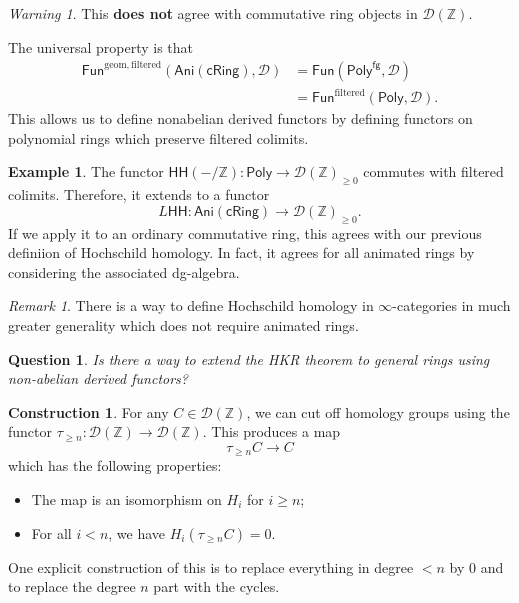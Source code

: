 \documentclass[10pt, oneside]{memoir}
\newtheorem{quest}[thm]{Question}
\theoremstyle{definition}
\newtheorem{con}[thm]{Construction}
\newtheorem{exm}[thm]{Example}
\theoremstyle{remark}
\newtheorem{rmk}[thm]{Remark}
\newtheorem{warn}[thm]{Warning}
\theoremstyle{plain}
\theoremstyle{definition}
\theoremstyle{remark}
\newcommand{\Z}{\mathbb{Z}}
\newcommand{\mc}[1]{\mathcal{#1}}
\newcommand{\mr}[1]{\mathrm{#1}}
\newcommand{\ms}[1]{\mathsf{#1}}
\newcommand{\1}{\mathbf{1}}
\newcommand{\2}{\mathbf{2}}
\newcommand{\3}{\mathbf{3}}
\newcommand{\HH}{\ms{HH}}
\begin{document}
\begin{warn}
    This \textbf{does not} agree with commutative ring objects in $\mc{D}(\Z)$.
\end{warn}

The universal property is that
\begin{align*}
    \ms{Fun}^{\mr{geom,filtered}}(\ms{Ani}(\ms{cRing}), \mc{D}) &= \ms{Fun}(\ms{Poly}^{\ms{fg}}, \mc{D}) \\
    &= \ms{Fun}^{\mr{filtered}}(\ms{Poly}, \mc{D}).
\end{align*}
This allows us to define nonabelian derived functors by defining functors on polynomial rings which preserve filtered colimits.

\begin{exm}
    The functor $\HH(-/\Z) \colon \ms{Poly} \to \mc{D}(\Z)_{\geq 0}$ commutes with filtered colimits. Therefore, it extends to a functor
    \[ L\HH \colon \ms{Ani}(\ms{cRing}) \to \mc{D}(\Z)_{\geq 0}. \]
    If we apply it to an ordinary commutative ring, this agrees with our previous definiion of Hochschild homology. In fact, it agrees for all animated rings by considering the associated dg-algebra.
\end{exm}

\begin{rmk}
    There is a way to define Hochschild homology in $\infty$-categories in much greater generality which does not require animated rings.
\end{rmk}

\begin{quest}
    Is there a way to extend the HKR theorem to general rings using non-abelian derived functors?
\end{quest}

\begin{con}
    For any $C \in \mc{D}(\Z)$, we can cut off homology groups using the functor $\tau_{\geq n} \colon \mc{D}(\Z) \to \mc{D}(\Z)$. This produces a map
    \[ \tau_{\geq n} C \to C \]
    which has the following properties:
    \begin{itemize}
        \item The map is an isomorphism on $H_i$ for $i \geq n$;
        \item For all $i < n$, we have $H_i(\tau_{\geq n} C) = 0$.
    \end{itemize}
    One explicit construction of this is to replace everything in degree $<n$ by $0$ and to replace the degree $n$ part with the cycles.
\end{con}
\end{document}
